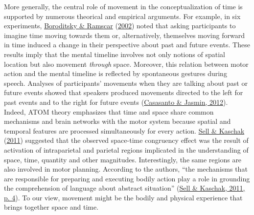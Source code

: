 \documentclass[
  a4paper,12pt,twoside,onecolumn,openright,final,oldfontcommands]{memoir}
\begin{document}
More generally, the central role of movement in the conceptualization of time is supported by numerous theorical and empirical arguments. For example, in six experiments, \protect\hyperlink{ref-boroditsky_roles_2002}{Boroditsky \& Ramscar} (\protect\hyperlink{ref-boroditsky_roles_2002}{2002}) noted that asking participants to imagine time moving towards them or, alternatively, themselves moving forward in time induced a change in their perspective about past and future events. These results imply that the mental timeline involves not only notions of spatial location but also movement \emph{through} space. Moreover, this relation between motor action and the mental timeline is reflected by spontaneous gestures during speech. Analyses of participants' movements when they are talking about past or future events showed that speakers produced movements directed to the left for past events and to the right for future events (\protect\hyperlink{ref-casasanto_hands_2012}{Casasanto \& Jasmin, 2012}). Indeed, ATOM theory emphasizes that time and space share common mechanisms and brain networks with the motor system because spatial and temporal features are processed simultaneously for every action. \protect\hyperlink{ref-sell_processing_2011}{Sell \& Kaschak} (\protect\hyperlink{ref-sell_processing_2011}{2011}) suggested that the observed space-time congruency effect was the result of activation of intraparietal and parietal regions implicated in the understanding of space, time, quantity and other magnitudes. Interestingly, the same regions are also involved in motor planning. According to the authors, ``the mechanisms that are responsible for preparing and executing bodily action play a role in grounding the comprehension of language about abstract situation'' (\protect\hyperlink{ref-sell_processing_2011}{Sell \& Kaschak, 2011, p. 4}). To our view, movement might be the bodily and physical experience that brings together space and time.
\end{document}
